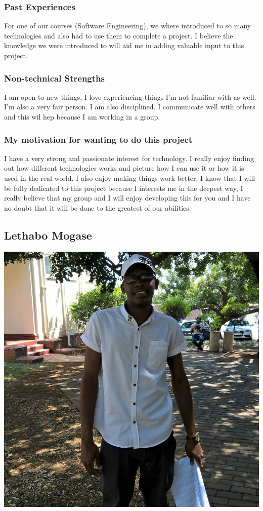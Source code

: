 \documentclass[a4paper,12pt]{article}
\begin{document}
			\subsubsection{Past Experiences}
			For one of our courses (Software Engineering), we where introduced to so many technologies and also had to use them to complete a project. I believe the knowledge we were introduced to will aid me in adding valuable input to this project.
			
			\subsubsection{Non-technical Strengths}
			I am open to new things, I love experiencing things I'm not familiar with as well. I'm also a very fair person. I am also disciplined. I communicate well with others and this wil hep because I am working in a group.
			\subsubsection{My motivation for wanting to do this project}
			I have a very strong and passionate interest for technology. I really enjoy finding out how different technologies works and picture how I can use it or  how it is used in the real world. I also enjoy making things work better. I know that I will be fully dedicated to this project because I interests me in the deepest way, I really believe that my group and I will enjoy developing this for you and I have no doubt that it will be done to the greatest of our abilities.  
		
		\newpage
		\subsection{Lethabo Mogase}
	\includegraphics[scale=0.2]{./Pictures/lethabo.jpg}\\
\end{document}
